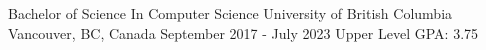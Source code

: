 \begin{cventries}
  \cventry
    {Bachelor of Science In Computer Science} %
    {University of British Columbia} %
    {Vancouver, BC, Canada} %
    {September 2017 - July 2023} %
    {Upper Level GPA: 3.75} %
\end{cventries}
